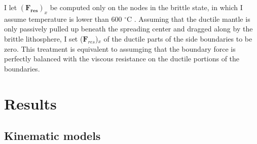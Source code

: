 \documentclass[letterpaper,12pt,notitle]{memphisthesis}                     %
\begin{document}
I let $(\boldsymbol{F_{res}})_x$ be computed only on the nodes in the brittle state, in which I assume temperature is lower than 600 $^\circ$C \citep[e.g.,][]{Violay2012}. Assuming that the ductile mantle is only passively pulled up beneath the spreading center and dragged along by the brittle lithosphere, I set ($\boldsymbol{F}_{res}$)$_x$ of the ductile parts of the side boundaries to be zero. This treatment is equivalent to assumging that the boundary force is perfectly balanced with the viscous resistance on the ductile portions of the boundaries. %

\chapter{Results}

\section{Kinematic models}
\end{document}
